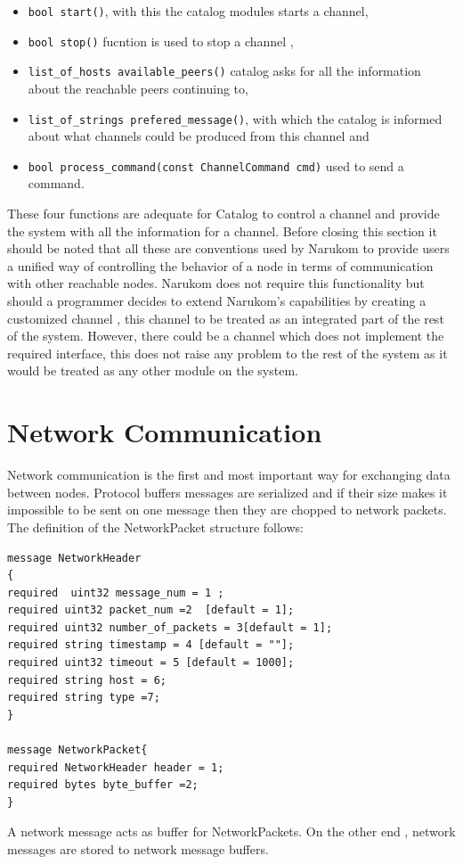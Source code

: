 \begin{itemize}
\item  {\tt bool start()}, with this the catalog modules starts a channel,
\item  {\tt bool stop()} fucntion is used to stop a channel ,
\item {\tt list\_of\_hosts available\_peers()} catalog asks for all the information about the reachable peers continuing to,
\item {\tt list\_of\_strings prefered\_message()}, with which the catalog is informed about what channels could be produced from this channel and 
\item {\tt bool process\_command(const ChannelCommand cmd)} used to  send a command.
\end{itemize}

These four functions are adequate for Catalog to control a channel and provide the system with all the information for a channel. Before closing this section it should be noted that all these are conventions used by Narukom to provide users a unified way of controlling the behavior of a node in terms of communication with other reachable nodes. Narukom does not require this functionality but should a programmer decides  to extend Narukom's capabilities by creating a customized channel , this channel to be treated as an integrated part of the rest of the system. However, there could be a channel  which does not implement the required interface, this does not raise any problem to the rest of the system as it would be treated as any other module on the system.


\section{Network Communication}
Network communication is the first and most important way for exchanging data between nodes. Protocol buffers messages are serialized and if their size makes it impossible to be sent on one message then they are chopped to network packets. The definition of the NetworkPacket structure follows:
\begin{verbatim}
message NetworkHeader
{
required  uint32 message_num = 1 ;
required uint32 packet_num =2  [default = 1];
required uint32 number_of_packets = 3[default = 1];
required string timestamp = 4 [default = ""];
required uint32 timeout = 5 [default = 1000];
required string host = 6;
required string type =7;
}

message NetworkPacket{
required NetworkHeader header = 1;
required bytes byte_buffer =2;
}

\end{verbatim}
A network message acts as buffer for NetworkPackets. On the other end , network messages are stored to network message buffers.
